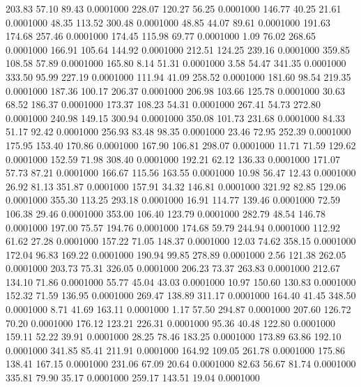 203.83   57.10   89.43   0.0001000
 228.07  120.27   56.25   0.0001000
 146.77   40.25   21.61   0.0001000
  48.35  113.52  300.48   0.0001000
  48.85   44.07   89.61   0.0001000
 191.63  174.68  257.46   0.0001000
 174.45  115.98   69.77   0.0001000
   1.09   76.02  268.65   0.0001000
 166.91  105.64  144.92   0.0001000
 212.51  124.25  239.16   0.0001000
 359.85  108.58   57.89   0.0001000
 165.80    8.14   51.31   0.0001000
   3.58   54.47  341.35   0.0001000
 333.50   95.99  227.19   0.0001000
 111.94   41.09  258.52   0.0001000
 181.60   98.54  219.35   0.0001000
 187.36  100.17  206.37   0.0001000
 206.98  103.66  125.78   0.0001000
  30.63   68.52  186.37   0.0001000
 173.37  108.23   54.31   0.0001000
 267.41   54.73  272.80   0.0001000
 240.98  149.15  300.94   0.0001000
 350.08  101.73  231.68   0.0001000
  84.33   51.17   92.42   0.0001000
 256.93   83.48   98.35   0.0001000
  23.46   72.95  252.39   0.0001000
 175.95  153.40  170.86   0.0001000
 167.90  106.81  298.07   0.0001000
  11.71   71.59  129.62   0.0001000
 152.59   71.98  308.40   0.0001000
 192.21   62.12  136.33   0.0001000
 171.07   57.73   87.21   0.0001000
 166.67  115.56  163.55   0.0001000
  10.98   56.47   12.43   0.0001000
  26.92   81.13  351.87   0.0001000
 157.91   34.32  146.81   0.0001000
 321.92   82.85  129.06   0.0001000
 355.30  113.25  293.18   0.0001000
  16.91  114.77  139.46   0.0001000
  72.59  106.38   29.46   0.0001000
 353.00  106.40  123.79   0.0001000
 282.79   48.54  146.78   0.0001000
 197.00   75.57  194.76   0.0001000
 174.68   59.79  244.94   0.0001000
 112.92   61.62   27.28   0.0001000
 157.22   71.05  148.37   0.0001000
  12.03   74.62  358.15   0.0001000
 172.04   96.83  169.22   0.0001000
 190.94   99.85  278.89   0.0001000
   2.56  121.38  262.05   0.0001000
 203.73   75.31  326.05   0.0001000
 206.23   73.37  263.83   0.0001000
 212.67  134.10   71.86   0.0001000
  55.77   45.04   43.03   0.0001000
  10.97  150.60  130.83   0.0001000
 152.32   71.59  136.95   0.0001000
 269.47  138.89  311.17   0.0001000
 164.40   41.45  348.50   0.0001000
   8.71   41.69  163.11   0.0001000
   1.17   57.50  294.87   0.0001000
 207.60  126.72   70.20   0.0001000
 176.12  123.21  226.31   0.0001000
  95.36   40.48  122.80   0.0001000
 159.11   52.22   39.91   0.0001000
  28.25   78.46  183.25   0.0001000
 173.89   63.86  192.10   0.0001000
 341.85   85.41  211.91   0.0001000
 164.92  109.05  261.78   0.0001000
 175.86  138.41  167.15   0.0001000
 231.06   67.09   20.64   0.0001000
  82.63   56.67   81.74   0.0001000
 335.81   79.90   35.17   0.0001000
 259.17  143.51   19.04   0.0001000
